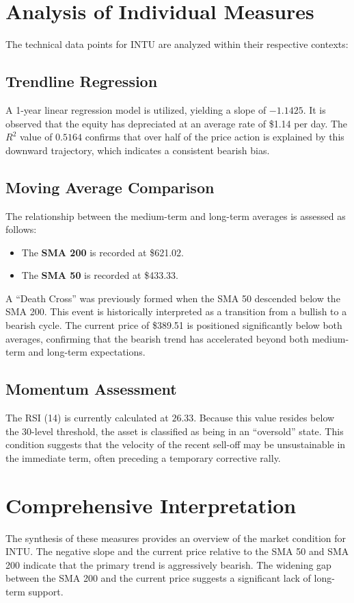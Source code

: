 \documentclass[letterpaper]{article}
\begin{document}
\section{Analysis of Individual Measures}
The technical data points for INTU are analyzed within their respective contexts:

\subsection{Trendline Regression}
A 1-year linear regression model is utilized, yielding a slope of $-1.1425$. It is observed that the equity has depreciated at an average rate of \$1.14 per day. The $R^2$ value of $0.5164$ confirms that over half of the price action is explained by this downward trajectory, which indicates a consistent bearish bias.

\subsection{Moving Average Comparison}
The relationship between the medium-term and long-term averages is assessed as follows:
\begin{itemize}
  \item The \textbf{SMA 200} is recorded at \$621.02.
  \item The \textbf{SMA 50} is recorded at \$433.33.
\end{itemize}
A ``Death Cross'' was previously formed when the SMA 50 descended below the SMA 200. This event is historically interpreted as a transition from a bullish to a bearish cycle. The current price of \$389.51 is positioned significantly below both averages, confirming that the bearish trend has accelerated beyond both medium-term and long-term expectations.

\subsection{Momentum Assessment}
The RSI (14) is currently calculated at $26.33$. Because this value resides below the 30-level threshold, the asset is classified as being in an ``oversold'' state. This condition suggests that the velocity of the recent sell-off may be unsustainable in the immediate term, often preceding a temporary corrective rally.

\section{Comprehensive Interpretation}
The synthesis of these measures provides an overview of the market condition for INTU. The negative slope and the current price relative to the SMA 50 and SMA 200 indicate that the primary trend is aggressively bearish. The widening gap between the SMA 200 and the current price suggests a significant lack of long-term support.
\end{document}
